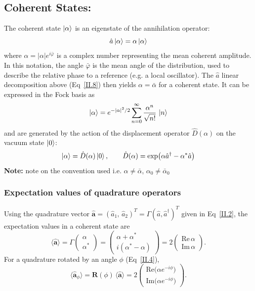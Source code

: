 \subsection*{Coherent States:}
The coherent state $\ket{\alpha}$ is an eigenstate of the annihilation operator:
\begin{equation}
\hat{a}\ket{\alpha} = \alpha \ket{\alpha}
\label{II.14}
\end{equation}
where $\alpha = |\alpha| e^{i\bar{\varphi}}$ is a complex number representing the mean coherent amplitude. In this notation, the angle $\bar{\varphi}$ is the mean angle of the distribution, used to describe the relative phase to a reference (e.g. a local oscillator). The $\hat{a}$ linear decomposition above (Eq~\eqref{II.8}) then yields $\alpha = \bar{\alpha}$ for a coherent state. It can be expressed in the Fock basis as
\begin{equation}
\ket{\alpha} = e^{-|\alpha|^2/2} \sum_{n=0}^\infty \frac{\alpha^n}{\sqrt{n!}}\,\ket{n}
\label{II.15}
\end{equation}
and are generated by the action of the displacement operator $\hat{D}(\alpha)$ on the vacuum state $\ket{0}$:
\begin{equation}
\ket{\alpha} = \hat{D}(\alpha)\ket{0},\qquad \hat{D}(\alpha) = \exp\!\left(\alpha \hat{a}^\dagger - \alpha^* \hat{a}\right)
\label{II.16}
\end{equation}
\noindent \textbf{Note:} \color{red} note on the convention used i.e. $\alpha \neq \bar{\alpha}$, $\alpha_0 \neq \bar{\alpha}_0$ \color{black}
\subsubsection*{Expectation values of quadrature operators}

Using the quadrature vector $\hat{\mathbf a} = (\hat{a}_1,\,\hat{a}_2)^T = \Gamma (\hat{a}, \hat{a}^\dagger)^T$ given in Eq~\eqref{II.2}, the expectation values in a coherent state are
\begin{equation}
\langle \hat{\mathbf a} \rangle
= \Gamma
\begin{pmatrix}\alpha\\ \alpha^*\end{pmatrix}
= \begin{pmatrix}
\alpha+\alpha^* \\[2pt]
i(\alpha^*-\alpha)
\end{pmatrix}
= 2\begin{pmatrix}
\mathrm{Re}\,\alpha \\[2pt]
\mathrm{Im}\,\alpha
\end{pmatrix}.
\label{II.CS.1}
\end{equation}
For a quadrature rotated by an angle $\phi$ (Eq~\ref{II.4}),
\begin{equation}
\langle \hat{\mathbf a}_\phi\rangle
= \mathbf R(\phi)\,\langle \hat{\mathbf a}\rangle
=
2\begin{pmatrix}
\mathrm{Re}\big(\alpha e^{-i\phi}\big) \\[2pt]
\mathrm{Im}\big(\alpha e^{-i\phi}\big)
\end{pmatrix}.
\end{equation}


